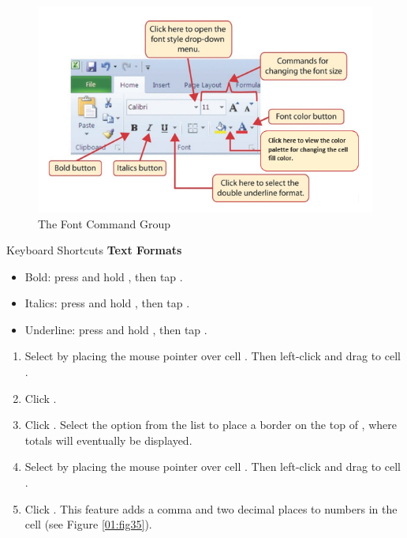 \begin{figure}[H]
	\centering
	\includegraphics[width=\maxwidth{.95\linewidth}]{gfx/ch01_fig34}
	\caption{The Font Command Group}
	\label{01:fig34}
\end{figure}

\begin{center}
	\begin{shtcutbox}{Keyboard Shortcuts}
		\textbf{Text Formats}
		\\
		\begin{itemize}
			\setlength{\itemsep}{0pt}
			\setlength{\parskip}{0pt}
			\setlength{\parsep}{0pt}
			
			\item Bold: press and hold , then tap .
			\item Italics: press and hold , then tap .
			\item Underline: press and hold , then tap .
			
		\end{itemize}
	\end{shtcutbox}
\end{center}

\begin{enumbox}
	\begin{enumerate}
		\item Select  by placing the mouse pointer over cell . Then left-click and drag to cell .
		\item Click .
		\item Click . Select the  option from the list to place a border on the top of , where totals will eventually be displayed.
		\item Select  by placing the mouse pointer over cell . Then left-click and drag to cell .
		\item Click . This feature adds a comma and two decimal places to numbers in the cell (see Figure \ref{01:fig35}).
	\end{enumerate}
\end{enumbox}

